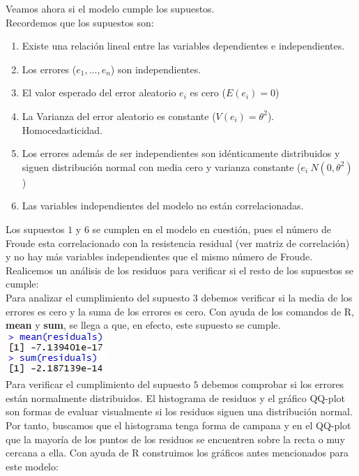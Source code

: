 \documentclass[twoside]{article}
\begin{document}
\begin{multicols}{2}
Veamos ahora si el modelo cumple los supuestos.\\
Recordemos que los supuestos son:
\begin{enumerate}
\item Existe una relaci\'on lineal entre las variables dependientes e independientes.
\item Los errores ($e_1,...,e_n$) son independientes.
\item El valor esperado del error aleatorio $e_i$ es cero ($E(e_i) = 0$)
\item La Varianza del error aleatorio es constante ($V(e_i) = \theta^2$). Homocedasticidad.
\item Los errores adem\'as de ser independientes son id\'enticamente distribuidos y siguen distribución normal con media cero y varianza constante ($e_i ~ N(0, \theta^2)$)
\item Las variables independientes del modelo no est\'an correlacionadas.
\end{enumerate}

Los supuestos $1$ y $6$ se cumplen en el modelo en cuesti\'on, pues el n\'umero de Froude esta correlacionado con la resistencia residual (ver matriz de correlaci\'on) y no hay m\'as variables independientes que el mismo n\'umero de Froude.\\
Realicemos un an\'alisis de los residuos para verificar si el resto de los supuestos se cumple:\\

Para analizar el cumplimiento del supuesto $3$ debemos verificar si la media de los errores es cero y la suma de los errores es cero. Con ayuda de los comandos de R, \textbf{mean} y \textbf{sum}, se llega a que, en efecto, este supuesto se cumple.\\

\includegraphics[scale = 0.7]{images/pic_04.png} \\

Para verificar el cumplimiento del supuesto $5$ debemos comprobar si los errores est\'an normalmente distribuidos. El histograma de residuos y el gr\'afico QQ-plot son formas de evaluar visualmente si los residuos siguen una distribuci\'on normal. Por tanto, buscamos que el histograma tenga forma de campana y en el QQ-plot que la mayor\'ia de los puntos de los residuos se encuentren sobre la recta o muy cercana a ella. Con ayuda de R construimos los gr\'aficos antes mencionados para este modelo:\\


\end{multicols}
\end{document}
